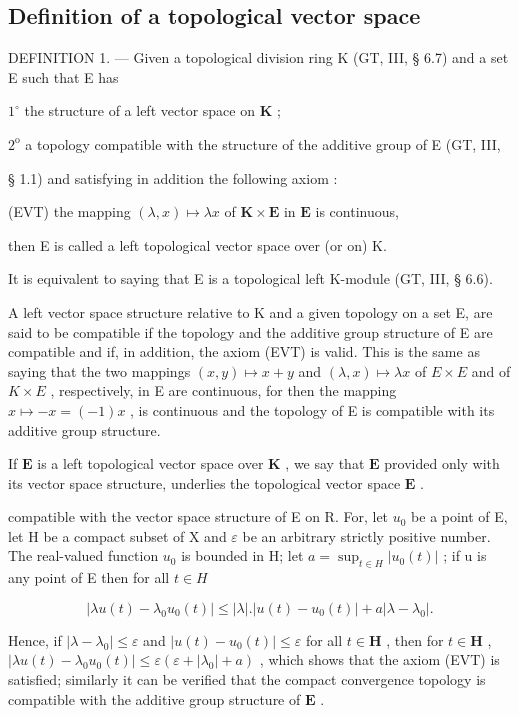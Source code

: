 \subsection{Definition of a topological vector space}

DEFINITION 1. --- Given a topological division ring K (GT, III, § 6.7) and a set E such that E has

\(1^{\circ}\) the structure of a left vector space on \(\mathbf{K}\) ;

\(2^{\mathrm{o}}\) a topology compatible with the structure of the additive group of E (GT, III,

§ 1.1) and satisfying in addition the following axiom :

(EVT) the mapping \((\lambda, x) \mapsto \lambda x\) of \(\mathbf{K} \times \mathbf{E}\) in \(\mathbf{E}\) is continuous,

then E is called a left topological vector space over (or on) K.

It is equivalent to saying that E is a topological left K-module (GT, III, § 6.6).

A left vector space structure relative to K and a given topology on a set E, are said to be compatible if the topology and the additive group structure of E are compatible and if, in addition, the axiom (EVT) is valid. This is the same as saying that the two mappings \((x, y) \mapsto x + y\) and \((\lambda, x) \mapsto \lambda x\) of \(E \times E\) and of \(K \times E\) , respectively, in E are continuous, for then the mapping \(x \mapsto -x = (-1)x\) , is continuous and the topology of E is compatible with its additive group structure.

If \(\mathbf{E}\) is a left topological vector space over \(\mathbf{K}\) , we say that \(\mathbf{E}\) provided only with its vector space structure, underlies the topological vector space \(\mathbf{E}\) .

compatible with the vector space structure of E on R. For, let \(u_{0}\) be a point of E, let H be a compact subset of X and \(\varepsilon\) be an arbitrary strictly positive number. The real-valued function \(u_{0}\) is bounded in H; let \(a = \sup_{t \in H} |u_{0}(t)|\) ; if u is any point of E then for all \(t \in H\)

\[
\left| \lambda u (t) - \lambda_ {0} u _ {0} (t) \right| \leqslant | \lambda |. \left| u (t) - u _ {0} (t) \right| + a \left| \lambda - \lambda_ {0} \right|.
\]

Hence, if \(|\lambda - \lambda_0| \leqslant \varepsilon\) and \(|u(t) - u_0(t)| \leqslant \varepsilon\) for all \(t \in \mathbf{H}\) , then for \(t \in \mathbf{H}\) , \(|\lambda u(t) - \lambda_0 u_0(t)| \leqslant \varepsilon (\varepsilon + |\lambda_0| + a)\) , which shows that the axiom (EVT) is satisfied; similarly it can be verified that the compact convergence topology is compatible with the additive group structure of \(\mathbf{E}\) .

